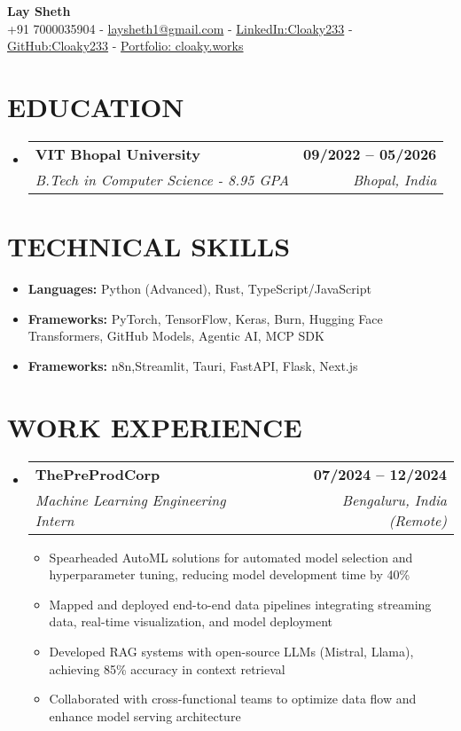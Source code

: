 \documentclass[letterpaper,11pt]{article}
\makeatletter
\def\spaceBelowHeaderContact{-2pt}
\def\spaceBelowEdSec{-8pt}
\def\spaceBelowTechSecContent{-8pt}
\def\spaceBetweenResumeItems{-4pt}
\def\spaceBetweenSubheadings{-1pt}
\def\spaceAfterSubheading{-7pt}
\newcommand{\resumeItem}[1]{
  \item\small{
    {#1 \vspace{\spaceBetweenResumeItems}}
  }
}
\newcommand{\resumeSubheading}[4]{
  \vspace{\spaceBetweenSubheadings}\item
    \begin{tabular*}{1.0\textwidth}[t]{l@{\extracolsep{\fill}}r}
      \textbf{\normalsize#1} & \textbf{\small #2} \\
      \textit{\normalsize#3} & \textit{\small #4} \\
    \end{tabular*}\vspace{\spaceAfterSubheading}
}
\newcommand{\resumeSubHeadingListStart}{\begin{itemize}[leftmargin=0.0in, label={}]}
\newcommand{\resumeSubHeadingListEnd}{\end{itemize}\vspace{\spaceBelowEdSec}}
\newcommand{\resumeItemListStart}{\begin{itemize}[leftmargin=0.1in]}
\newcommand{\resumeItemListEnd}{\end{itemize}\vspace{\spaceBelowTechSecContent}}
\makeatother
\begin{document}
\begin{center}
    {\huge \textbf{Lay Sheth}} \\ \vspace{1pt}
    {+91 7000035904}
    \small{ - }
    {\href{mailto://laysheth1@gmail.com}{laysheth1@gmail.com}}
    \small{ - }
    {\href{https://linkedin.com/in/cloaky233}{LinkedIn:Cloaky233}}
    \small{ - }
    {\href{https://github.com/CLoaKY233}{GitHub:Cloaky233}}
    \small{ - }
    {\href{https://cloaky.works}{Portfolio: cloaky.works}}
    \vspace{\spaceBelowHeaderContact}
\end{center}

\section{{EDUCATION}}
\resumeSubHeadingListStart
    \resumeSubheading
      {VIT Bhopal University}{09/2022 -- 05/2026}
      {B.Tech in Computer Science - 8.95 GPA}{Bhopal, India}
\resumeSubHeadingListEnd

\section{TECHNICAL SKILLS}



\resumeItemListStart
    \resumeItem{
        \textbf{Languages:} Python (Advanced), Rust, TypeScript/JavaScript}
        \resumeItem{\textbf{Frameworks:} PyTorch, TensorFlow, Keras, Burn, Hugging Face Transformers, GitHub Models, Agentic AI, MCP SDK}
        \resumeItem{\textbf{Frameworks:} n8n,Streamlit, Tauri, FastAPI, Flask, Next.js}

\resumeItemListEnd
\vspace{-4pt}

\section{{WORK EXPERIENCE}}
\resumeSubHeadingListStart
    \resumeSubheading
      {ThePreProdCorp}{07/2024 -- 12/2024}
      {Machine Learning Engineering Intern}{Bengaluru, India (Remote)}
      \resumeItemListStart
        \resumeItem{Spearheaded AutoML solutions for automated model selection and hyperparameter tuning, reducing model development time by 40\%}
        \resumeItem{Mapped and deployed end-to-end data pipelines integrating streaming data, real-time visualization, and model deployment}
        \resumeItem{Developed RAG systems with open-source LLMs (Mistral, Llama), achieving 85\% accuracy in context retrieval}
        \resumeItem{Collaborated with cross-functional teams to optimize data flow and enhance model serving architecture}
      \resumeItemListEnd
\resumeSubHeadingListEnd
\end{document}
